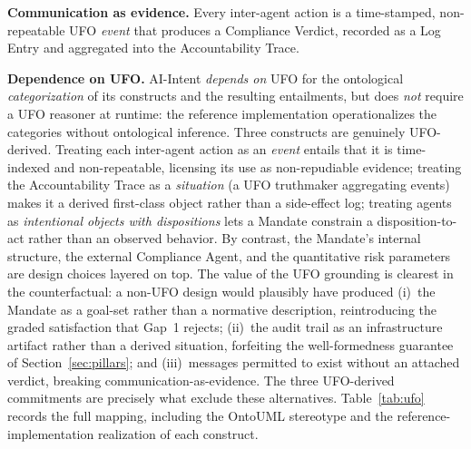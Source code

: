 \documentclass[runningheads]{llncs}
\begin{document}
\textbf{Communication as evidence.} Every inter-agent action is a
time-stamped, non-repeatable UFO \emph{event} that produces a Compliance
Verdict, recorded as a Log Entry and aggregated into the Accountability
Trace.

\medskip
\noindent\textbf{Dependence on UFO.} AI-Intent \emph{depends on} UFO for
the ontological \emph{categorization} of its constructs and the resulting
entailments, but does \emph{not} require a UFO reasoner at runtime: the
reference implementation operationalizes the categories without
ontological inference. Three constructs are genuinely UFO-derived.
Treating each inter-agent action as an \emph{event} entails that it is
time-indexed and non-repeatable, licensing its use as non-repudiable
evidence; treating the Accountability Trace as a \emph{situation} (a UFO
truthmaker aggregating events) makes it a derived first-class object
rather than a side-effect log; treating agents as \emph{intentional
objects with dispositions} lets a Mandate constrain a disposition-to-act
rather than an observed behavior. By contrast, the Mandate's internal
structure, the external Compliance Agent, and the quantitative risk
parameters are design choices layered on top. The value of the UFO
grounding is clearest in the counterfactual: a non-UFO design would
plausibly have produced (i)~the Mandate as a goal-set rather than a
normative description, reintroducing the graded satisfaction that Gap~1
rejects; (ii)~the audit trail as an infrastructure artifact rather than a
derived situation, forfeiting the well-formedness guarantee of
Section~\ref{sec:pillars}; and (iii)~messages permitted to exist without
an attached verdict, breaking communication-as-evidence. The three
UFO-derived commitments are precisely what exclude these alternatives.
Table~\ref{tab:ufo} records the full mapping, including the OntoUML
stereotype and the reference-implementation realization of each construct.
\end{document}
